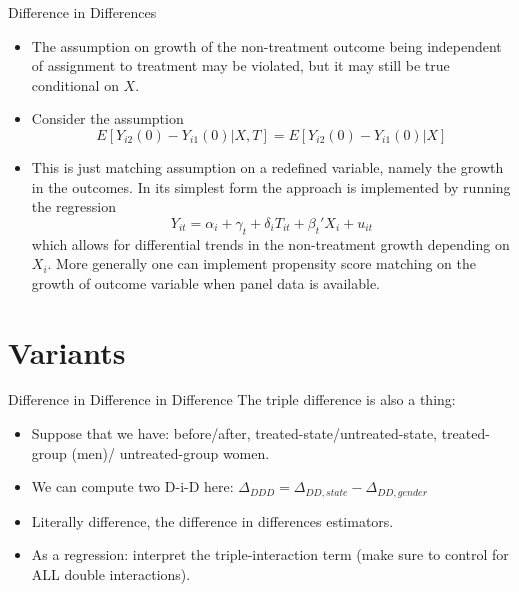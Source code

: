 \documentclass[xcolor=pdftex,dvipsnames,table,mathserif,aspectratio=169]{beamer}
\begin{document}
\begin{frame}{Difference in Differences}
\begin{itemize}
\item The assumption on growth of the non-treatment outcome being independent of assignment to treatment may be violated, but it may still be true conditional on $X$.
\item Consider the assumption
$$ E[Y_{i2}(0)- Y_{i1}(0) | X,T] = E[Y_{i2}(0)- Y_{i1}(0) | X] $$ 
\item This is just matching assumption on a redefined variable, namely the growth in the outcomes. In its simplest form the approach is implemented by running the regression
$$ Y_{it} = \alpha_i + \gamma_t + \delta_i T_{it} + \beta_t' X_i + u_{it}$$ 
which allows for differential trends in the non-treatment growth depending on $X_i$. More generally one can implement propensity score matching on the growth of outcome variable when panel data is available.
\end{itemize}
\end{frame}

\section{Variants}

\begin{frame}{Difference in Difference in Difference}
The triple difference is also a thing:
\begin{itemize}
\item Suppose that we have: before/after, treated-state/untreated-state, treated-group (men)/ untreated-group women.
\item We can compute two D-i-D here: $\Delta_{DDD} = \Delta_{DD,state} - \Delta_{DD,gender}$ 
\item Literally difference, the difference in differences estimators.
\item As a regression: interpret the triple-interaction term (make sure to control for ALL double interactions).
\end{itemize}
\end{frame}
\end{document}
